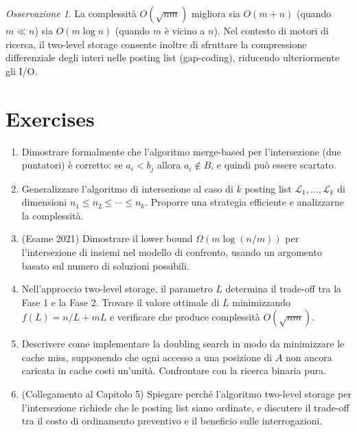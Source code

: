 \documentclass[12pt, a4paper, oneside]{book}
\theoremstyle{plain}
\theoremstyle{definition}
\theoremstyle{remark}
\newtheorem{osservazione}[teorema]{Osservazione}
\begin{document}
\begin{osservazione}
La complessità $O(\sqrt{nm})$ migliora sia $O(m+n)$ (quando $m \ll n$) sia $O(m\log n)$ (quando $m$ è vicino a $n$). Nel contesto di motori di ricerca, il two-level storage consente inoltre di sfruttare la compressione differenziale degli interi nelle posting list (gap-coding), riducendo ulteriormente gli I/O.
\end{osservazione}

\section{Exercises}

\begin{enumerate}
  \item Dimostrare formalmente che l'algoritmo merge-based per l'intersezione (due puntatori) è corretto: se $a_i < b_j$ allora $a_i \notin B$, e quindi può essere scartato.

  \item Generalizzare l'algoritmo di intersezione al caso di $k$ posting list $\mathcal{L}_1, \ldots, \mathcal{L}_k$ di dimensioni $n_1 \le n_2 \le \cdots \le n_k$. Proporre una strategia efficiente e analizzarne la complessità.

  \item (Esame 2021) Dimostrare il lower bound $\Omega(m \log(n/m))$ per l'intersezione di insiemi nel modello di confronto, usando un argomento basato sul numero di soluzioni possibili.

  \item Nell'approccio two-level storage, il parametro $L$ determina il trade-off tra la Fase 1 e la Fase 2. Trovare il valore ottimale di $L$ minimizzando $f(L) = n/L + mL$ e verificare che produce complessità $O(\sqrt{nm})$.

  \item Descrivere come implementare la doubling search in modo da minimizzare le cache miss, supponendo che ogni accesso a una posizione di $A$ non ancora caricata in cache costi un'unità. Confrontare con la ricerca binaria pura.

  \item (Collegamento al Capitolo 5) Spiegare perché l'algoritmo two-level storage per l'intersezione richiede che le posting list siano ordinate, e discutere il trade-off tra il costo di ordinamento preventivo e il beneficio sulle interrogazioni.
\end{enumerate}
\end{document}
